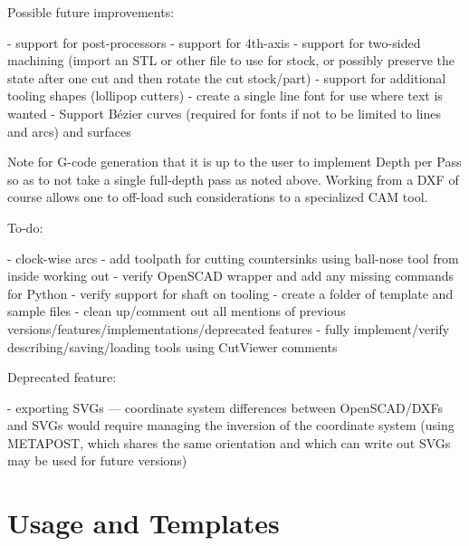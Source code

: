 \documentclass{ltxdoc}
\begin{document}
\begin{readme}
Possible future improvements:

 - support for post-processors
 - support for 4th-axis
 - support for two-sided machining (import an STL or other file to use for stock, or possibly preserve the state after one cut and then rotate the cut stock/part)
 - support for additional tooling shapes (lollipop cutters)
 - create a single line font for use where text is wanted
 - Support Bézier curves (required for fonts if not to be limited to lines and arcs) and surfaces

Note for G-code generation that it is up to the user to implement Depth per Pass so as to not take a single full-depth pass as noted above. Working from a DXF of course allows one to off-load such considerations to a specialized CAM tool.

To-do:

 - clock-wise arcs
 - add toolpath for cutting countersinks using ball-nose tool from inside working out
 - verify OpenSCAD wrapper and add any missing commands for Python
 - verify support for shaft on tooling
 - create a folder of template and sample files
 - clean up/comment out all mentions of previous versions/features/implementations/deprecated features
 - fully implement/verify describing/saving/loading tools using CutViewer comments

Deprecated feature:

 - exporting SVGs --- coordinate system differences between OpenSCAD/DXFs and SVGs would require managing the inversion of the coordinate system (using METAPOST, which shares the same orientation and which can write out SVGs may be used for future versions)

\end{readme}



\clearpage

\section{Usage and Templates}
\end{document}
